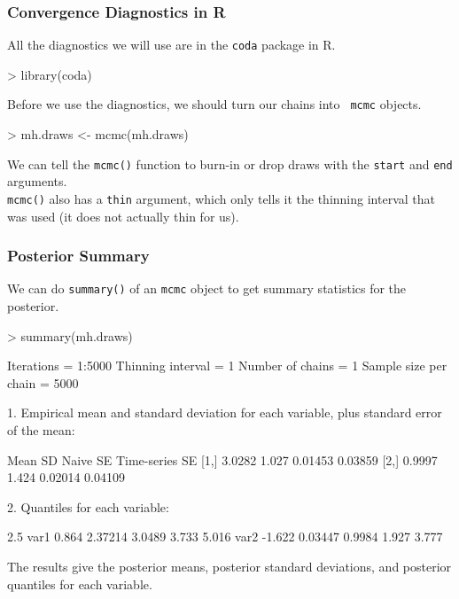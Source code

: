 \documentclass[handout]{beamer}
\begin{document}
\begin{frame}[fragile]
\frametitle{Convergence Diagnostics in R}
All the diagnostics we will use are in the {\tt coda} package in R.
\medskip
\pause
\tiny
\begin{Schunk}
\begin{Sinput}
> library(coda)
\end{Sinput}
\end{Schunk}
\normalsize
\bigskip
\pause
Before we use the diagnostics, we should turn our chains into {\tt
mcmc} objects.
\medskip
\pause
\tiny
\begin{Schunk}
\begin{Sinput}
> mh.draws <- mcmc(mh.draws)
\end{Sinput}
\end{Schunk}
\bigskip
\normalsize
\pause
We can tell the {\tt mcmc()} function to burn-in or drop draws with
the {\tt start} and {\tt end} arguments. \\
\bigskip
\pause
{\tt mcmc()} also has a {\tt thin} argument, which only tells it the
thinning interval that was used (it does not actually thin for us).
\end{frame}

\begin{frame}[fragile]
\frametitle{Posterior Summary}
\pause
We can do {\tt summary()} of an {\tt mcmc} object to get summary
statistics for the posterior.
\medskip
\pause
\tiny
\begin{Schunk}
\begin{Sinput}
> summary(mh.draws)
\end{Sinput}
\begin{Soutput}
Iterations = 1:5000
Thinning interval = 1 
Number of chains = 1 
Sample size per chain = 5000 

1. Empirical mean and standard deviation for each variable,
   plus standard error of the mean:

       Mean    SD Naive SE Time-series SE
[1,] 3.0282 1.027  0.01453        0.03859
[2,] 0.9997 1.424  0.02014        0.04109

2. Quantiles for each variable:

       2.5%
var1  0.864 2.37214 3.0489 3.733 5.016
var2 -1.622 0.03447 0.9984 1.927 3.777
\end{Soutput}
\end{Schunk}
\bigskip
\pause
\normalsize
The results give the posterior means, posterior standard deviations,
and posterior quantiles for each variable. 
\end{frame}
\end{document}
